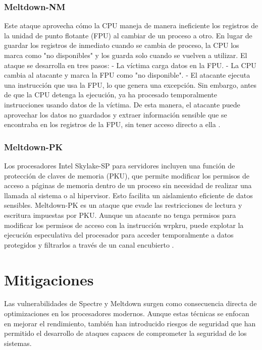 \documentclass[lettersize,compsoc]{IEEEtran}
\begin{document}
\subsubsection{\textbf{Meltdown-NM}}
Este ataque aprovecha cómo la CPU maneja de manera ineficiente los registros de la unidad de punto flotante (FPU) al cambiar de un proceso a otro. En lugar de guardar los registros de inmediato cuando se cambia de proceso, la CPU los marca como "no disponibles" y los guarda solo cuando se vuelven a utilizar.
\newline
El ataque se desarrolla en tres pasos:
- La víctima carga datos en la FPU.
- La CPU cambia al atacante y marca la FPU como "no disponible".
- El atacante ejecuta una instrucción que usa la FPU, lo que genera una excepción. Sin embargo, antes de que la CPU detenga la ejecución, ya ha procesado temporalmente instrucciones usando datos de la víctima.
\newline De esta manera, el atacante puede aprovechar los datos no guardados y extraer información sensible que se encontraba en los registros de la FPU, sin tener acceso directo a ella \cite{Meltdown variantes}.

\subsubsection{\textbf{Meltdown-PK}}
Los procesadores Intel Skylake-SP para servidores incluyen una función de protección de claves de memoria (PKU), que permite modificar los permisos de acceso a páginas de memoria dentro de un proceso sin necesidad de realizar una llamada al sistema o al hipervisor. Esto facilita un aislamiento eficiente de datos sensibles.
\newline Meltdown-PK es un ataque que evade las restricciones de lectura y escritura impuestas por PKU. Aunque un atacante no tenga permisos para modificar los permisos de acceso con la instrucción wrpkru, puede explotar la ejecución especulativa del procesador para acceder temporalmente a datos protegidos y filtrarlos a través de un canal encubierto \cite{Meltdown variantes}.


\section{Mitigaciones} Las vulnerabilidades de Spectre y Meltdown surgen como consecuencia directa de optimizaciones en los procesadores modernos. Aunque estas técnicas se enfocan en mejorar el rendimiento, también han introducido riesgos de seguridad que han permitido el desarrollo de ataques capaces de comprometer la seguridad de los sistemas.
\end{document}
